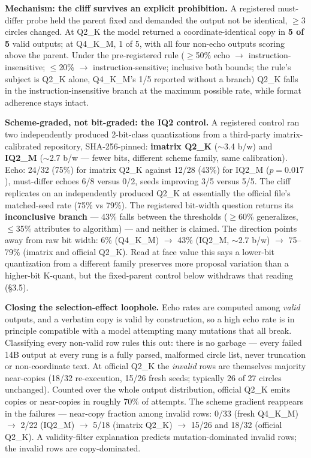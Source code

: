 \textbf{Mechanism: the cliff survives an explicit prohibition.} A registered must-differ probe held the parent fixed and demanded the output not be identical, $\ge$3 circles changed. At Q2\_K the model returned a coordinate-identical copy in \textbf{5 of 5} valid outputs; at Q4\_K\_M, 1 of 5, with all four non-echo outputs scoring above the parent. Under the pre-registered rule ($\ge$50\% echo $\to$ instruction-insensitive; $\le$20\% $\to$ instruction-sensitive; inclusive both bounds; the rule's subject is Q2\_K alone, Q4\_K\_M's 1/5 reported without a branch) Q2\_K falls in the instruction-insensitive branch at the maximum possible rate, while format adherence stays intact.

\textbf{Scheme-graded, not bit-graded: the IQ2 control.} A registered control ran two independently produced 2-bit-class quantizations from a third-party imatrix-calibrated repository, SHA-256-pinned: \textbf{imatrix Q2\_K} ($\sim$3.4 b/w) and \textbf{IQ2\_M} ($\sim$2.7 b/w --- fewer bits, different scheme family, same calibration). Echo: 24/32 (75\%) for imatrix Q2\_K against 12/28 (43\%) for IQ2\_M ($p = 0.017$), must-differ echoes 6/8 versus 0/2, seeds improving 3/5 versus 5/5. The cliff replicates on an independently produced Q2\_K at essentially the official file's matched-seed rate (75\% vs 79\%). The registered bit-width question returns its \textbf{inconclusive branch} --- 43\% falls between the thresholds ($\ge$60\% generalizes, $\le$35\% attributes to algorithm) --- and neither is claimed. The direction points away from raw bit width: 6\% (Q4\_K\_M) $\to$ 43\% (IQ2\_M, $\sim$2.7 b/w) $\to$ 75--79\% (imatrix and official Q2\_K). Read at face value this says a lower-bit quantization from a different family preserves more proposal variation than a higher-bit K-quant, but the fixed-parent control below withdraws that reading (\S3.5).

\textbf{Closing the selection-effect loophole.} Echo rates are computed among \emph{valid} outputs, and a verbatim copy is valid by construction, so a high echo rate is in principle compatible with a model attempting many mutations that all break. Classifying every non-valid row rules this out: there is no garbage --- every failed 14B output at every rung is a fully parsed, malformed circle list, never truncation or non-coordinate text. At official Q2\_K the \emph{invalid} rows are themselves majority near-copies (18/32 re-execution, 15/26 fresh seeds; typically 26 of 27 circles unchanged). Counted over the whole output distribution, official Q2\_K emits copies or near-copies in roughly 70\% of attempts. The scheme gradient reappears in the failures --- near-copy fraction among invalid rows: 0/33 (fresh Q4\_K\_M) $\to$ 2/22 (IQ2\_M) $\to$ 5/18 (imatrix Q2\_K) $\to$ 15/26 and 18/32 (official Q2\_K). A validity-filter explanation predicts mutation-dominated invalid rows; the invalid rows are copy-dominated.


